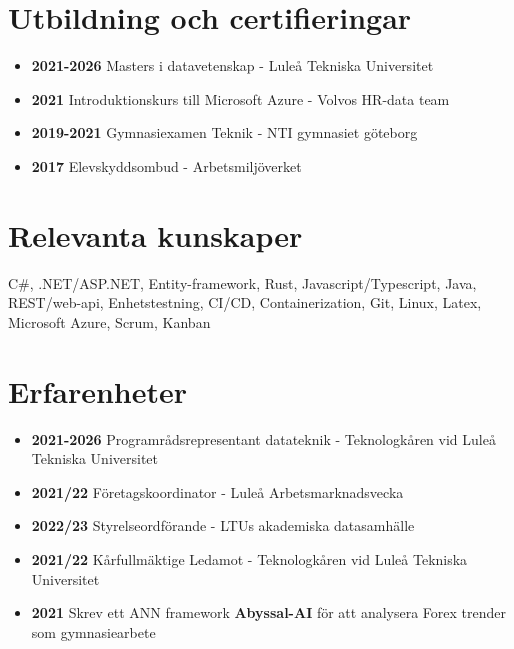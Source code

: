 \documentclass[a4paper]{article}
\begin{document}
\section{Utbildning och certifieringar}
    \begin{itemize}
        \item{
            \textbf{2021-2026} Masters i datavetenskap - Luleå Tekniska Universitet 
        }

        \item{
            \textbf{2021} Introduktionskurs till Microsoft Azure - Volvos HR-data team 
        }

        \item{
            \textbf{2019-2021} Gymnasiexamen Teknik - NTI gymnasiet göteborg
        }

        \item{ %
            \textbf{2017} Elevskyddsombud - Arbetsmiljöverket
        }
    \end{itemize}

\section{Relevanta kunskaper}
    C\#, .NET/ASP.NET, Entity-framework, Rust, Javascript/Typescript, Java, REST/web-api,
    Enhetstestning, CI/CD, Containerization, Git, Linux, Latex, Microsoft Azure, Scrum,
    Kanban

\section{Erfarenheter}

    \begin{itemize}
        \item {\textbf{2021-2026} Programrådsrepresentant datateknik - Teknologkåren vid Luleå Tekniska Universitet}
        \item {\textbf{2021/22} Företagskoordinator - Luleå Arbetsmarknadsvecka}
        \item {\textbf{2022/23} Styrelseordförande - LTUs akademiska datasamhälle}
        \item {\textbf{2021/22} Kårfullmäktige Ledamot - Teknologkåren vid Luleå Tekniska Universitet}
        \item {\textbf{2021} Skrev ett ANN framework \textbf{Abyssal-AI} för att analysera Forex trender som gymnasiearbete}
        
    \end{itemize}
\end{document}
